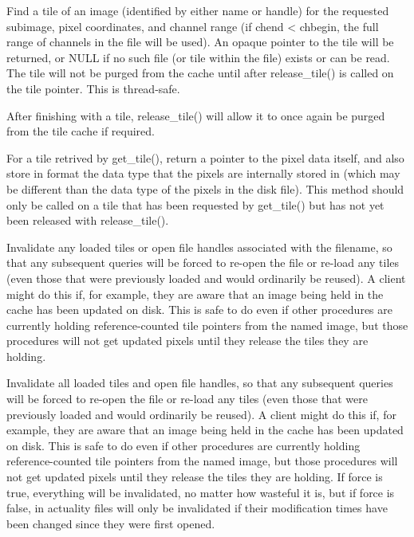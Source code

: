 Find a tile of an image (identified by either name or handle)
for the requested {\cf subimage}, pixel
coordinates, and channel range (if {\cf chend < chbegin}, the full
range of channels in the file will be used).
An opaque pointer to the tile will be returned,
or {\cf NULL} if no such file (or tile within the file) exists or can
be read.  The tile will not be purged from the cache until 
after {\cf release_tile()} is called on the tile pointer.  This is
thread-safe.
\apiend

After finishing with a tile, {\cf release_tile()} will allow it to 
once again be purged from the tile cache if required.
\apiend

For a tile retrived by {\cf get_tile()}, return a pointer to the
pixel data itself, and also store in {\cf format} the data type that
the pixels are internally stored in (which may be different than
the data type of the pixels in the disk file).  This method should
only be called on a tile that has been requested by 
{\cf get_tile()} but has not yet been released with {\cf release_tile()}.
\apiend

Invalidate any loaded tiles or open file handles associated with
the filename, so that any subsequent queries will be forced to
re-open the file or re-load any tiles (even those that were
previously loaded and would ordinarily be reused).  A client
might do this if, for example, they are aware that an image
being held in the cache has been updated on disk.  This is safe
to do even if other procedures are currently holding 
reference-counted tile pointers from the named image, but those 
procedures will not get updated pixels until they release the 
tiles they are holding.
\apiend

Invalidate all loaded tiles and open file handles, so that any
subsequent queries will be forced to re-open the file or re-load any
tiles (even those that were previously loaded and would ordinarily be
reused).  A client might do this if, for example, they are aware that an
image being held in the cache has been updated on disk.  This is safe to
do even if other procedures are currently holding reference-counted tile
pointers from the named image, but those procedures will not get updated
pixels until they release the tiles they are holding.  If force is true,
everything will be invalidated, no matter how wasteful it is, but if
force is false, in actuality files will only be invalidated if their
modification times have been changed since they were first opened.
\apiend

